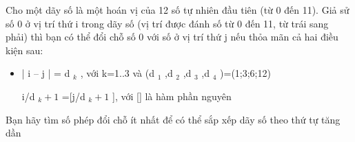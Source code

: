 Cho một dãy số là một hoán vị của 12 số tự nhiên đầu tiên (từ 0 đến 11). Giả sử số 0 ở vị trí thứ i trong dãy số (vị trí được đánh số từ 0 đến 11, từ trái sang phải) thì bạn có thể đổi chỗ số 0 với số ở vị trí thứ j nếu thỏa mãn cả hai điều kiện sau:  
\begin{itemize}
	\item     | i – j | = d    $_     k    $    , với k=1..3 và (d    $_     1    $    ,d    $_     2    $    ,d    $_     3    $    ,d    $_     4    $    )=(1;3;6;12)    


	\item     [i/d    $_     k+1    $    ]=[j/d    $_     k+1    $    ], với [] là hàm phần nguyên   
\end{itemize}

   Bạn hãy tìm số phép đổi chỗ ít nhất để có thể sắp xếp dãy số theo thứ tự tăng dần